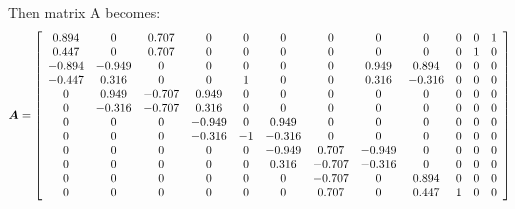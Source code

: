 \documentclass{article}
\begin{document}
Then matrix A becomes: \\ 
\begin{align*}
\boldsymbol{A} = \left[\begin{array}{cccccccccccc}
0.894 & 0 & 0.707 & 0 & 0 & 0 & 0 & 0 & 0 & 0 & 0 & 1 \\ 
0.447 & 0 & 0.707 & 0 & 0 & 0 & 0 & 0 & 0 & 0 & 1 & 0 \\ 
-0.894 & -0.949 & 0 & 0 & 0 & 0 & 0 & 0.949 & 0.894 & 0 & 0 & 0 \\ 
-0.447 & 0.316 & 0 & 0 & 1 & 0 & 0 & 0.316 & -0.316 & 0 & 0 & 0 \\ 
0 & 0.949 & -0.707 & 0.949 & 0 & 0 & 0 & 0 & 0 & 0 & 0 & 0 \\ 
0 & -0.316 & -0.707 & 0.316 & 0 & 0 & 0 & 0 & 0 & 0 & 0 & 0 \\ 
0 & 0 & 0 & -0.949 & 0 & 0.949 & 0 & 0 & 0 & 0 & 0 & 0 \\ 
0 & 0 & 0 & -0.316 & -1 & -0.316 & 0 & 0 & 0 & 0 & 0 & 0 \\ 
0 & 0 & 0 & 0 & 0 & -0.949 & 0.707 & -0.949 & 0 & 0 & 0 & 0 \\ 
0 & 0 & 0 & 0 & 0 & 0.316 & -0.707 & -0.316 & 0 & 0 & 0 & 0 \\ 
0 & 0 & 0 & 0 & 0 & 0 & -0.707 & 0 & 0.894 & 0 & 0 & 0 \\
0 & 0 & 0 & 0 & 0 & 0 & 0.707 & 0 & 0.447 & 1 & 0 & 0 \\  
\end{array}\right]
\end{align*} 
\end{document}
